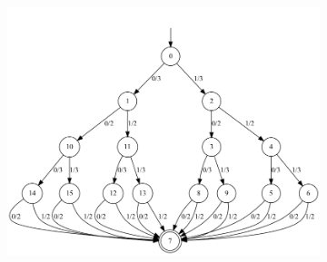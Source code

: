 \begin{figure}
\begin{subfigure}{.1\textwidth}
        \caption{}
        \label{add_inners_1_img_aut2}
    \end{subfigure}
    \hfil
    \begin{subfigure}{.52\textwidth}
        \centering
        \includegraphics[scale=0.26]{obrazky-figures/add_inners_1_img_aut3.png}
        \caption{}
        \label{add_inners_1_img_aut3}
    \end{subfigure}
    \hfil
    \begin{subfigure}{0.24\textwidth}
        \centering

\end{subfigure}
\end{figure}
